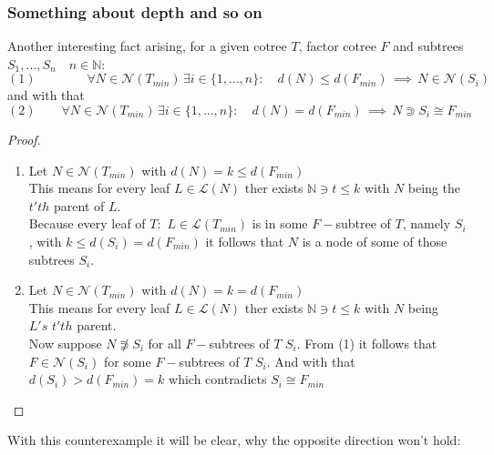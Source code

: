 \documentclass[a4paper,12pt]{article}
\theoremstyle{definition}
\begin{document}
	\subsubsection{Something about depth and so on}
	Another interesting fact arising, for a given cotree $T$, factor cotree $F$ and subtrees\\ $S_1,...,S_n\quad n\in\mathds{N}$:
	\[(1)\qquad\qquad\forall N\in \mathcal{N}(T_{min})\, \exists i\in\{1,...,n\}:\quad d(N)\leq d(F_{min})\,\implies\, N\in \mathcal{N}(S_i) \]
	and with that 
	\[(2)\qquad \forall N\in \mathcal{N}(T_{min})\, \exists i\in\{1,...,n\}:\quad d(N)= d(F_{min})\,\implies\, N\Supset S_i\cong F_{min} \]
	\begin{proof}
		\begin{enumerate}[(1)]
			\item Let $N\in \mathcal{N}(T_{min})$ with $d(N)= k\leq d(F_{min})$\\
			This means for every leaf $L\in \mathcal{L}(N)$ ther exists $\mathds{N}\ni t\leq k$ with $N$ being the $ t'th$ parent of $L$.\\
			Because every leaf of $T$: $\, L\in \mathcal{L}(T_{min})$ is in some $F-$subtree of $T$, namely $S_i$, with $k \leq d(S_i)=d(F_{min})$ it follows that $N$ is a node of some of those subtrees $S_i$.
			\item  Let $N\in \mathcal{N}(T_{min})$ with $d(N)= k=d(F_{min})$\\
			This means for every leaf $L\in \mathcal{L}(N)$ ther exists $\mathds{N}\ni t\leq k$ with $N$ being $L's\,\, t'th$ parent.\\
			Now suppose $N\not \Supset S_i$ for all $F-$subtrees of $T$ $S_i$.
			From (1) it follows that $F\in \mathcal{N}(S_i)$ for some $F-$subtrees of $T$ $S_i$. And with that $d(S_i)>d(F_{min})=k$ which contradicts $S_i\cong F_{min}$
		\end{enumerate}
	\end{proof}
	With this counterexample it will be clear, why the opposite direction won't hold:
	\begin{center}
	\end{center}
\end{document}
